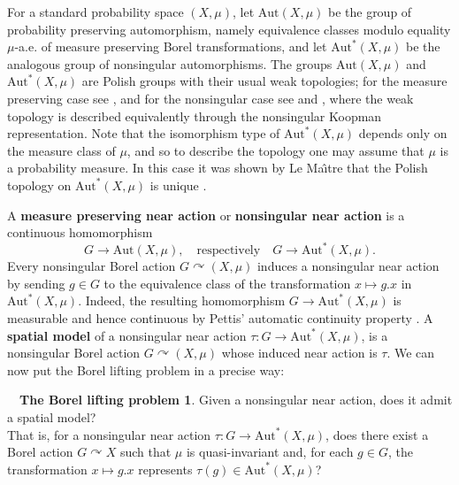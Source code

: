 \documentclass{amsart}
\numberwithin{equation}{subsection}
\theoremstyle{plain}
\theoremstyle{definition}
\newtheorem*{BLP}{\(\quad\)The Borel lifting problem}
\theoremstyle{plain}
\begin{document}
\smallskip

For a standard probability space \(\left(X,\mu\right)\), let \(\mathrm{Aut}\left(X,\mu\right)\) be the group of probability preserving automorphism, namely equivalence classes modulo equality \(\mu\)-a.e. of measure preserving Borel transformations, and let \(\mathrm{Aut}^{\ast}\left(X,\mu\right)\) be the analogous group of nonsingular automorphisms. The groups \(\mathrm{Aut}\left(X,\mu\right)\) and \(\mathrm{Aut}^{\ast}\left(X,\mu\right)\) are Polish groups with their usual weak topologies; for the measure preserving case see \cite[\S4.5]{Pestov2006}, and for the nonsingular case see \cite[\S1]{danilenko1995topological} and \cite[\S4.1]{giordano2007some}, where the weak topology is described equivalently through the nonsingular Koopman representation. Note that the isomorphism type of \(\mathrm{Aut}^{\ast}\left(X,\mu\right)\) depends only on the measure class of \(\mu\), and so to describe the topology one may assume that \(\mu\) is a probability measure. In this case it was shown by Le Ma\^{\i}tre that the Polish topology on \(\mathrm{Aut}^{\ast}\left(X,\mu\right)\) is unique \cite[Thm.~1.4]{lema2022polish}.

\smallskip

A {\bf measure preserving near action} or {\bf nonsingular near action} is a continuous homomorphism
\[G\to\mathrm{Aut}\left(X,\mu\right),\quad\text{respectively}\quad G\to\mathrm{Aut}^{\ast}\left(X,\mu\right).\]
Every nonsingular Borel action \(G\curvearrowright\left(X,\mu\right)\) induces a nonsingular near action by sending \(g\in G\) to the equivalence class of the transformation \(x\mapsto g.x\) in \(\mathrm{Aut}^{\ast}\left(X,\mu\right)\). Indeed, the resulting homomorphism \(G\to\mathrm{Aut}^{\ast}\left(X,\mu\right)\) is measurable and hence continuous by Pettis' automatic continuity property \cite[\S9.C]{kechris2012descriptive}. A {\bf spatial model} of a nonsingular near action \(\tau:G\to\mathrm{Aut}^{\ast}\left(X,\mu\right)\), is a nonsingular Borel action \(G\curvearrowright\left(X,\mu\right)\) whose induced near action is \(\tau\). We can now put the Borel lifting problem in a precise way:

\begin{BLP}\label{blp:nonsingular}
Given a nonsingular near action, does it admit a spatial model?\\
That is, for a nonsingular near action \(\tau:G\to\mathrm{Aut}^{\ast}\left(X,\mu\right)\), does there exist a Borel action \(G\curvearrowright X\) such that \(\mu\) is quasi-invariant and, for each \(g\in G\), the transformation \(x\mapsto g.x\) represents \(\tau\left(g\right)\in\mathrm{Aut}^{\ast}\left(X,\mu\right)\)?
\end{BLP}
\end{document}
